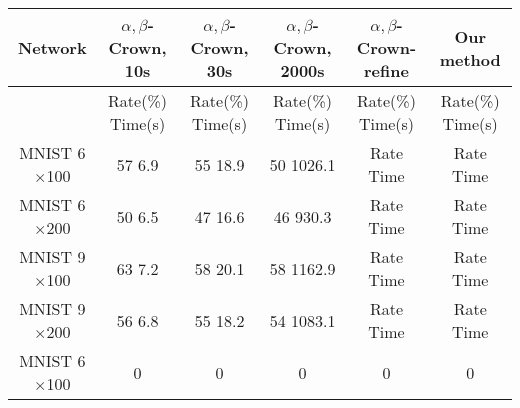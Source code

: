 \begin{tabular}{|c|c|c|c|c|c|}
	\hline
	Network & $\alpha,\beta$-Crown, 10s & $\alpha,\beta$-Crown, 30s & $\alpha,\beta$-Crown, 2000s & $\alpha,\beta$-Crown-refine & Our method \\ \hline
	& Rate(\%) \hfill Time(s) & Rate(\%) \hfill Time(s) & Rate(\%) \hfill Time(s) & Rate(\%) \hfill Time(s) & Rate(\%) \hfill Time(s)\\ \hline
	MNIST 6$\times$100 & 57 \hfill 6.9 & 55 \hfill 18.9 & 50 \hfill 1026.1 & Rate \hfill Time & Rate \hfill Time \\ \hline
	MNIST 6$\times$200 & 50 \hfill 6.5 & 47 \hfill 16.6 & 46 \hfill 930.3 & Rate \hfill Time & Rate \hfill Time \\ \hline
	MNIST 9$\times$100 & 63 \hfill 7.2 & 58 \hfill 20.1 & 58 \hfill 1162.9 & Rate \hfill Time & Rate \hfill Time \\ \hline
	MNIST 9$\times$200 & 56 \hfill 6.8 & 55 \hfill 18.2 & 54 \hfill 1083.1 & Rate \hfill Time & Rate \hfill Time \\ \hline
	MNIST 6$\times$100 & 0 & 0 & 0 & 0 & 0 \\ \hline
\end{tabular}